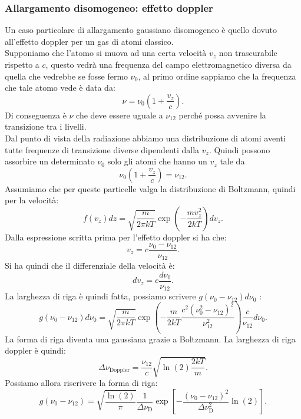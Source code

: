 \subsubsection{Allargamento disomogeneo: effetto doppler}%
Un caso particolare di allargamento gaussiano disomogeneo è quello dovuto all'effetto doppler per un gas di atomi classico.\\
Supponiamo che l'atomo si muova ad una certa velocità $v_z$  non trascurabile rispetto a $c$, questo vedrà una frequenza del campo elettromagnetico diversa da quella che vedrebbe se fosse fermo $\nu_0$, al primo ordine sappiamo che la frequenza che tale atomo vede è data da:
\[
    \nu  = \nu_0\left(1+\frac{v_z}{c}\right)
.\] 
Di conseguenza è $\nu$ che deve essere uguale a $\nu_{12}$  perché possa avvenire la transizione tra i livelli.\\
Dal punto di vista della radiazione abbiamo una distribuzione di atomi aventi tutte frequenze di transizione diverse dipendenti dalla $v_z$. Quindi possono assorbire un determinato $\nu_0 $ solo gli atomi che hanno un $v_z$  tale da
\[
    \nu_0\left(1+\frac{v_z}{c}\right) = \nu_{12}
.\] 
Assumiamo che per queste particelle valga la distribuzione di Boltzmann, quindi per la velocità:
\[
    f(v_z) dz = 
    \sqrt{\frac{m}{2\pi kT}} \exp\left(- \frac{mv_z^2}{2kT}\right)dv_z
.\] 
Dalla espressione scritta prima per l'effetto doppler si ha che:
\[
    v_z = c \frac{\nu_0-\nu_{12}}{\nu_{12}}
.\] 
Si ha quindi che il differenziale della velocità è:
\[
    dv_z = c \frac{d\nu_0}{\nu_{12}}
.\] 
La larghezza di riga è quindi fatta, possiamo scrivere $g(\nu_0-\nu_{12})d\nu_0$ :
\[
    g(\nu_0-\nu_{12}) d\nu_0 = 
    \sqrt{\frac{m}{2\pi kT}}
    \exp\left(-\frac{m}{2kT}
    \frac{c^2\left(\nu_0^2-\nu_{12}\right)^2}{\nu_{12}^2}\right)
    \frac{c}{\nu_{12}}d\nu_0
.\] 
La forma di riga diventa una gaussiana grazie a Boltzmann. La larghezza di riga doppler è quindi:
\[
    \Delta\nu _\text{Doppler} = \frac{\nu_{12}}{c}\sqrt{\ln (2)  \frac{2kT}{m}}
.\] 
Possiamo allora riscrivere la forma di riga:
\[
    g(\nu_0-\nu_{12}) = \sqrt{\frac{\ln (2) }{\pi}}
    \frac{1}{\Delta\nu_\text{D} }
    \exp\left[- 
    \frac{\left(\nu_0-\nu_{12}\right)^2}{\Delta\nu_\text{D} ^2}\ln (2)
    \right]
.\]
